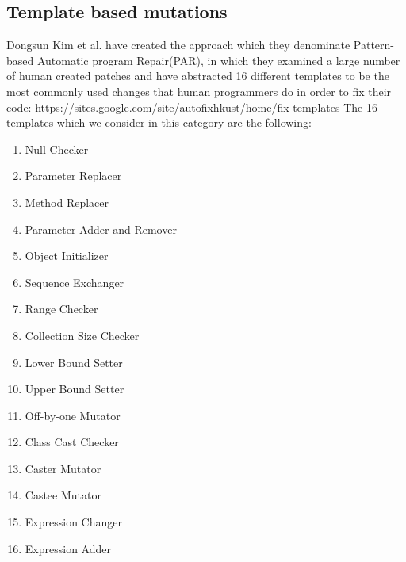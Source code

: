 \documentclass[conference]{IEEEtran}
\begin{document}
\subsection{Template based mutations}
Dongsun Kim et al. have created the approach which they denominate Pattern-based Automatic program Repair(PAR), in which they examined a large number of human created patches and have abstracted 16 different templates to be the most commonly used changes that human programmers do in order to fix their code: \url{https://sites.google.com/site/autofixhkust/home/fix-templates}
The 16 templates which we consider in this category are the following:
\begin{enumerate}
\item Null Checker
\item Parameter Replacer
\item Method Replacer
\item Parameter Adder and Remover
\item Object Initializer
\item Sequence Exchanger
\item Range Checker
\item Collection Size Checker
\item Lower Bound Setter
\item Upper Bound Setter
\item Off-by-one Mutator
\item Class Cast Checker
\item Caster Mutator
\item Castee Mutator
\item Expression Changer
\item Expression Adder
\end{enumerate}
\end{document}
